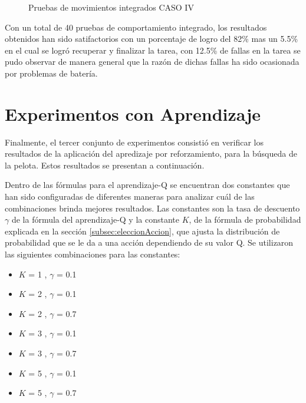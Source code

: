 \begin{figure}
\caption{Pruebas de movimientos integrados CASO IV}
\label{fig:caso4}
\end{figure} 

Con un total de 40 pruebas de comportamiento integrado, los resultados obtenidos han sido satifactorios con un porcentaje de logro del 82\% mas un 5.5\% en el cual se logró recuperar y finalizar la tarea, con 12.5\% de fallas en la tarea se pudo observar de manera general que la razón de dichas fallas ha sido ocasionada por problemas de batería.
 

\section{Experimentos con Aprendizaje}\label{sec:experimentosAprend}

Finalmente, el tercer conjunto de experimentos consistió en verificar los resultados de la aplicaci\'on del apredizaje por reforzamiento, para la búsqueda de la pelota. Estos resultados se presentan a continuaci\'on.

Dentro de las fórmulas para el aprendizaje-Q se encuentran dos constantes que han sido configuradas de diferentes maneras para analizar cuál de las combinaciones brinda mejores resultados. Las constantes son la tasa de descuento $\gamma$ de la fórmula del aprendizaje-Q y la constante $K$, de la fórmula de probabilidad explicada en la secci\'on \ref{subsec:eleccionAccion}, que ajusta la distribución de probabilidad que se le da a una acción dependiendo de su valor Q. Se utilizaron las siguientes combinaciones para las constantes:

\begin{itemize}
\item $K$ = 1 , $\gamma$ = 0.1
\item $K$ = 2 , $\gamma$ = 0.1 
\item $K$ = 2 , $\gamma$ = 0.7
\item $K$ = 3 , $\gamma$ = 0.1
\item $K$ = 3 , $\gamma$ = 0.7
\item $K$ = 5 , $\gamma$ = 0.1
\item $K$ = 5 , $\gamma$ = 0.7
   
\end{itemize}

